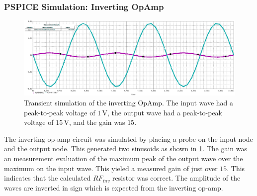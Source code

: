 \documentclass[11pt]{article}
\begin{document}
\subsubsection{PSPICE Simulation: Inverting OpAmp}
\begin{figure}[h]
	\includegraphics[width=\textwidth]{capture_inv_thick}
	\caption{Transient simulation of the inverting OpAmp.  The input wave had a peak-to-peak voltage of $1\,\si\volt$, the output wave had a peak-to-peak voltage of $15\,\si\volt$, and the gain was $15$.}
	\label{fig:capture_inv}
\end{figure}

The inverting op-amp circuit was simulated by placing a probe on the input node and the output node. This generated two sinusoids as shown in \ref{fig:capture_inv}. The gain was an measurement evaluation of the maximum peak of the output wave over the maximum on the input wave. This yieled a measured gain of just over $15$. This indicates that the calculated $RF_{inv}$ resistor was correct. The amplitude of the waves are inverted in sign which is expected from the inverting op-amp.
\end{document}
